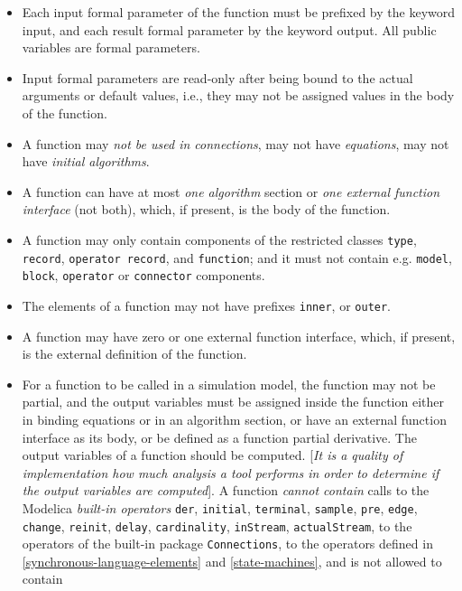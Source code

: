 \begin{itemize}
\item
  Each input formal parameter of the function must be prefixed by the
  keyword input, and each result formal parameter by the keyword output.
  All public variables are formal parameters.
\item
  Input formal parameters are read-only after being bound to the actual
  arguments or default values, i.e., they may not be assigned values in
  the body of the function.
\item
  A function may \emph{not be used in connections}, may not have
  \emph{equations}, may not have \emph{initial algorithms}.
\item
  A function can have at most \emph{one algorithm} section or \emph{one
  external function interface} (not both), which, if present, is the
  body of the function.
\item
  A function may only contain components of the restricted classes
  \lstinline!type!, \lstinline!record!, \lstinline!operator record!, and \lstinline!function!;
  and it must not contain e.g.
  \lstinline!model!, \lstinline!block!, \lstinline!operator! or \lstinline!connector!
  components.
\item
  The elements of a function may not have prefixes \lstinline!inner!, or \lstinline!outer!.
\item
  A function may have zero or one external function interface, which, if
  present, is the external definition of the function.
\item
  For a function to be called in a simulation model, the function may
  not be partial, and the output variables must be assigned inside the
  function either in binding equations or in an algorithm section,
  or have an external function interface as its body, or be defined as a
  function partial derivative. The output variables of a function should
  be computed. {[}\emph{It is a quality of implementation how much
  analysis a tool performs in order to determine if the output variables
  are computed}{]}. A function \emph{cannot contain} calls to the
  Modelica \emph{built-in operators} \lstinline!der!, \lstinline!initial!,
	\lstinline!terminal!, \lstinline!sample!,
  \lstinline!pre!, \lstinline!edge!, \lstinline!change!,
	\lstinline!reinit!, \lstinline!delay!, \lstinline!cardinality!,
	\lstinline!inStream!, \lstinline!actualStream!,
  to the operators of the built-in package \lstinline!Connections!, to the operators
  defined in \autoref{synchronous-language-elements} and \autoref{state-machines}, and is not allowed to contain

\end{itemize}
